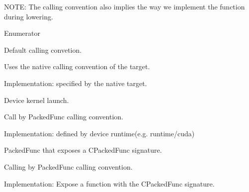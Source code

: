 N\+O\+TE\+: The calling convention also implies the way we implement the function during lowering. \begin{Desc}
\item[Enumerator]\par
\begin{description}
\item[{\em 
k\+Default\hypertarget{namespacetvm_a85e4536ea4e1c8d3d48c61135f0a8ff0a6867faeaa475fda467e48267db2bb8a8}{}\label{namespacetvm_a85e4536ea4e1c8d3d48c61135f0a8ff0a6867faeaa475fda467e48267db2bb8a8}
}]Default calling convetion. 
\begin{DoxyItemize}
\item Uses the native calling convention of the target.
\item Implementation\+: specified by the native target. 
\end{DoxyItemize}\item[{\em 
k\+Device\+Kernel\+Launch\hypertarget{namespacetvm_a85e4536ea4e1c8d3d48c61135f0a8ff0aea7c0ea92da6200bb14ea17a6094e2bc}{}\label{namespacetvm_a85e4536ea4e1c8d3d48c61135f0a8ff0aea7c0ea92da6200bb14ea17a6094e2bc}
}]Device kernel launch. 
\begin{DoxyItemize}
\item Call by Packed\+Func calling convention.
\item Implementation\+: defined by device runtime(e.\+g. runtime/cuda) 
\end{DoxyItemize}\item[{\em 
k\+C\+Packed\+Func\hypertarget{namespacetvm_a85e4536ea4e1c8d3d48c61135f0a8ff0ae7694043e4825265becdb58550b4e443}{}\label{namespacetvm_a85e4536ea4e1c8d3d48c61135f0a8ff0ae7694043e4825265becdb58550b4e443}
}]Packed\+Func that exposes a C\+Packed\+Func signature. 
\begin{DoxyItemize}
\item Calling by Packed\+Func calling convention.
\item Implementation\+: Expose a function with the C\+Packed\+Func signature. 
\end{DoxyItemize}\end{description}
\end{Desc}
